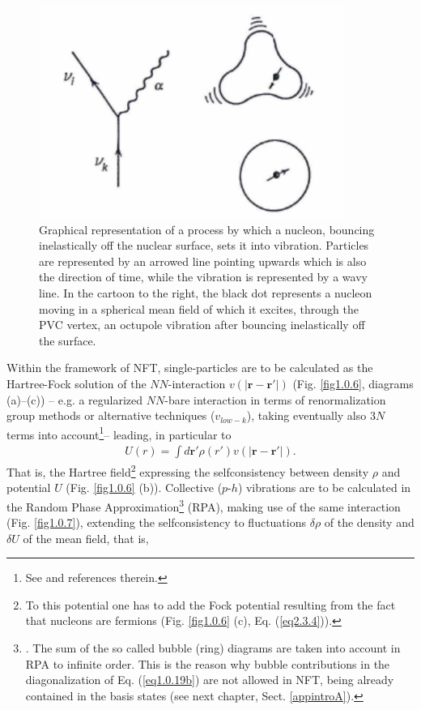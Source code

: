   \begin{figure}
  	\centerline {
  		\includegraphics*[width=10cm]{introduccion/figs/figpreface5}
  	}
  	\caption{Graphical representation of  a process  by which a nucleon, bouncing inelastically off the nuclear surface, sets it into vibration. Particles are represented by an arrowed line pointing upwards which is also the direction of time, while the vibration is represented by a wavy line. In the cartoon to the right, the black dot represents a nucleon moving in a spherical mean field of which it excites, through the PVC vertex, an octupole vibration after bouncing inelastically off the surface.}
  	\label{fig1.0.5}
  \end{figure}
Within the framework of NFT, single-particles are to be calculated as the Hartree-Fock solution of the $NN$-interaction $v(|\mathbf r-\mathbf r'|)$ (Fig. \ref{fig1.0.6}, diagrams (a)--(c)) -- e.g. a regularized $NN$-bare interaction in terms of renormalization group methods or alternative techniques ($v_{low-k}$), taking eventually also 3$N$ terms into account\footnote{See \cite{Bogner:10} and references therein.}-- leading, in particular to
\begin{align}\label{eq1.0.18}
U(r)=\int d\mathbf r' \rho(r')v\left(|\mathbf r-\mathbf r'|\right).
\end{align}
That is, the Hartree field\footnote{To this potential one has to add the Fock potential resulting from the fact that nucleons are fermions  (Fig. \ref{fig1.0.6} (c), Eq. (\ref{eq2.3.4})).} expressing the selfconsistency between density $\rho$ and potential $U$ (Fig. \ref{fig1.0.6} (b)). Collective ($p$-$h$) vibrations are to be calculated in the Random Phase Approximation\footnote{\label{f12C1} \cite{Bohm:51,Bohm:53}. The sum of the so called bubble (ring) diagrams are taken into account in RPA to infinite order. This is the reason why bubble contributions in the diagonalization of Eq. (\ref{eq1.0.19b}) are not allowed in NFT, being already contained in the basis states (see next chapter, Sect. \ref{appintroA}).} (RPA), making use of the same interaction (Fig. \ref{fig1.0.7}), extending the selfconsistency to fluctuations $\delta\rho$ of the density and $\delta U$ of the mean field, that is,

